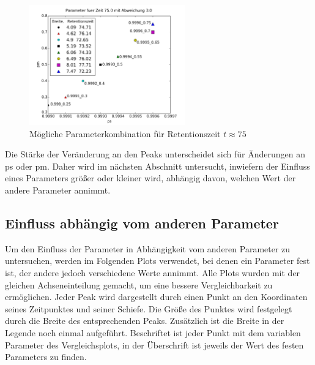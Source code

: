 \begin{figure}[h]
\centering
\includegraphics[width=0.6\textwidth]{bilder/paramsfuert75}
\caption{Mögliche Parameterkombination für Retentionszeit $t \approx 75$}
\label{params_at_time}
\end{figure}




Die Stärke der Veränderung an den Peaks unterscheidet sich für Änderungen an ps oder pm. Daher wird im nächsten Abschnitt untersucht, inwiefern der Einfluss eines Parameters größer oder kleiner wird, abhängig davon, welchen Wert der andere Parameter annimmt.

\subsection{Einfluss abhängig vom anderen Parameter}

Um den Einfluss der Parameter in Abhängigkeit vom anderen Parameter zu untersuchen, werden im Folgenden Plots verwendet, bei denen ein Parameter fest ist, der andere jedoch verschiedene Werte annimmt. Alle Plots wurden mit der gleichen Achseneinteilung gemacht, um eine bessere Vergleichbarkeit zu ermöglichen. Jeder Peak wird dargestellt durch einen Punkt an den Koordinaten seines Zeitpunktes und seiner Schiefe. Die Größe des Punktes wird festgelegt durch die Breite des entsprechenden Peaks. Zusätzlich ist die Breite in der Legende noch einmal aufgeführt. Beschriftet ist jeder Punkt mit dem variablen Parameter des Vergleichsplots, in der Überschrift ist jeweils der Wert des festen Parameters zu finden.



